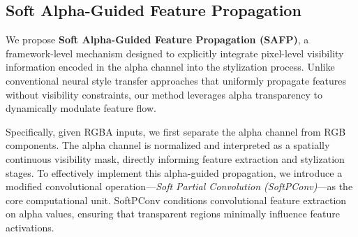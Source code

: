 \documentclass[letterpaper]{article} %
\begin{document}





\subsection{Soft Alpha-Guided Feature Propagation}

We propose \textbf{Soft Alpha-Guided Feature Propagation (SAFP)}, a framework-level mechanism designed to explicitly integrate pixel-level visibility information encoded in the alpha channel into the stylization process. Unlike conventional neural style transfer approaches that uniformly propagate features without visibility constraints, our method leverages alpha transparency to dynamically modulate feature flow.

Specifically, given RGBA inputs, we first separate the alpha channel from RGB components. The alpha channel is normalized and interpreted as a spatially continuous visibility mask, directly informing feature extraction and stylization stages. To effectively implement this alpha-guided propagation, we introduce a modified convolutional operation—\textit{Soft Partial Convolution (SoftPConv)}—as the core computational unit. SoftPConv conditions convolutional feature extraction on alpha values, ensuring that transparent regions minimally influence feature activations.
\end{document}
